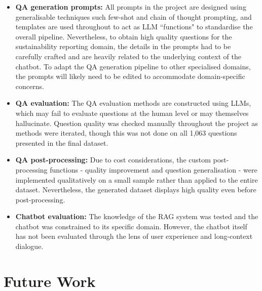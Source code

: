 \begin{itemize}
    \item \textbf{QA generation prompts:} All prompts in the project are designed using generalisable techniques such few-shot and chain of thought prompting, and templates are used throughout to act as LLM ``functions" to standardise the overall pipeline. Nevertheless, to obtain high quality questions for the sustainability reporting domain, the details in the prompts had to be carefully crafted and are heavily related to the underlying context of the chatbot. To adapt the QA generation pipeline to other specialised domains, the prompts will likely need to be edited to accommodate domain-specific concerns.
    \item \textbf{QA evaluation:} The QA evaluation methods are constructed using LLMs, which may fail to evaluate questions at the human level or may themselves hallucinate. Question quality was checked manually throughout the project as methods were iterated, though this was not done on all 1,063 questions presented in the final dataset.
    \item \textbf{QA post-processing:} Due to cost considerations, the custom post-processing functions - quality improvement and question generalisation - were implemented qualitatively on a small sample rather than applied to the entire dataset. Nevertheless, the generated dataset displays high quality even before post-processing.
    \item \textbf{Chatbot evaluation:} The knowledge of the RAG system was tested and the chatbot was constrained to its specific domain. However, the chatbot itself has not been evaluated through the lens of user experience and long-context dialogue.
\end{itemize}


\section{Future Work}


